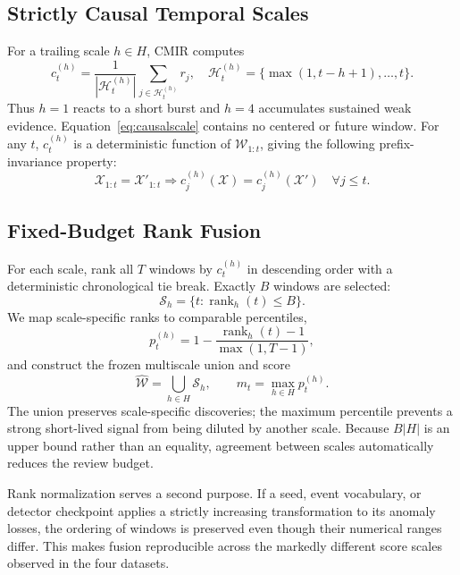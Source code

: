\documentclass[lettersize,journal]{IEEEtran}
\newcommand{\method}{CMIR}
\newcommand{\rank}{\operatorname{rank}}
\begin{document}
\subsection{Strictly Causal Temporal Scales}

For a trailing scale $h\in H$, \method{} computes
\begin{equation}
 c_t^{(h)}=\frac{1}{|\mathcal H_t^{(h)}|}
 \sum_{j\in\mathcal H_t^{(h)}}r_j,
 \quad
 \mathcal H_t^{(h)}=\{\max(1,t-h+1),\ldots,t\}.
 \label{eq:causalscale}
\end{equation}
Thus $h=1$ reacts to a short burst and $h=4$ accumulates sustained weak evidence.
Equation~\eqref{eq:causalscale} contains no centered or future window.  For any
$t$, $c_t^{(h)}$ is a deterministic function of $\mathcal{W}_{1:t}$, giving the
following prefix-invariance property:
\begin{equation}
 \mathcal{X}_{1:t}=\mathcal{X}'_{1:t}
 \Longrightarrow c_j^{(h)}(\mathcal{X})=c_j^{(h)}(\mathcal{X}')
 \quad \forall j\leq t.
 \label{eq:prefix}
\end{equation}

\subsection{Fixed-Budget Rank Fusion}

For each scale, rank all $T$ windows by $c_t^{(h)}$ in descending order with a
deterministic chronological tie break.  Exactly $B$ windows are selected:
\begin{equation}
 \mathcal S_h=\{t:\rank_h(t)\leq B\}.
 \label{eq:scalechoice}
\end{equation}
We map scale-specific ranks to comparable percentiles,
\begin{equation}
 p_t^{(h)}=1-\frac{\rank_h(t)-1}{\max(1,T-1)},
 \label{eq:percentile}
\end{equation}
and construct the frozen multiscale union and score
\begin{equation}
 \widehat{\mathcal W}=\bigcup_{h\in H}\mathcal S_h,
 \qquad m_t=\max_{h\in H}p_t^{(h)}.
 \label{eq:fusion}
\end{equation}
The union preserves scale-specific discoveries; the maximum percentile prevents
a strong short-lived signal from being diluted by another scale.  Because
$B|H|$ is an upper bound rather than an equality, agreement between scales
automatically reduces the review budget.

Rank normalization serves a second purpose.  If a seed, event vocabulary, or
detector checkpoint applies a strictly increasing transformation to its anomaly
losses, the ordering of windows is preserved even though their numerical ranges
differ.  This makes fusion reproducible across the markedly different score
scales observed in the four datasets.
\end{document}
